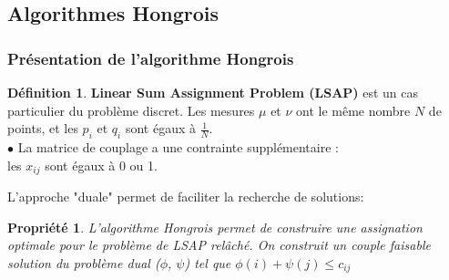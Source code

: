 \documentclass{beamer}
\newtheorem{prop}{Propriété}
\theoremstyle{definition}
\newtheorem{defi}{Définition}
\begin{document}
\subsection{Algorithmes Hongrois}

\begin{frame}
	\frametitle{Présentation de l'algorithme Hongrois}
	\begin{defi}
		 \textbf{Linear Sum Assignment Problem (LSAP)} est un cas particulier du problème discret. Les mesures $\mu$ et $\nu$ ont le même nombre $N$ de points, et les $p_i$ et $q_i$ sont égaux à $\frac{1}{N}$.\\[0.25cm]
		\noindent$\bullet$ La matrice de couplage a une contrainte supplémentaire :\\ les $x_{ij}$ sont égaux à 0 ou 1.
	\end{defi}
L'approche "duale" permet de faciliter la recherche de solutions:
\begin{prop}
	L'algorithme Hongrois permet de construire une assignation optimale pour le problème de LSAP relâché. On construit un couple faisable solution du problème dual ($\phi$, $\psi$) tel que $\phi(i) + \psi(j) \leq c_{ij}$
\end{prop} 
\end{frame}
\end{document}

